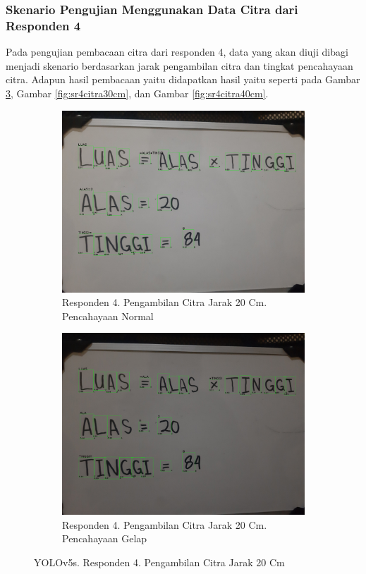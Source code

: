 \subsubsection{Skenario Pengujian Menggunakan Data Citra dari Responden 4}
\label{subsubsec:sskenarioresponden4}

Pada pengujian pembacaan citra dari responden 4, data yang akan diuji dibagi menjadi skenario berdasarkan jarak pengambilan citra dan tingkat pencahayaan citra. Adapun hasil pembacaan yaitu didapatkan hasil yaitu seperti pada Gambar \ref*{fig:sr4citra20cm}, Gambar \ref*{fig:sr4citra30cm}, dan Gambar \ref*{fig:sr4citra40cm}.

\begin{figure}[H]
  \begin{subfigure}{.5\textwidth}
    \centering
    \captionsetup{width=.8\linewidth}
    \includegraphics[width=.8\linewidth]{gambar/yolov5s/responden4/hakimaxt20cm00-result.jpg}
    \caption{Responden 4. Pengambilan Citra Jarak 20 Cm. Pencahayaan Normal}
    \label{fig:sr4tcitra20cm}
  \end{subfigure}%
  \begin{subfigure}{.5\textwidth}
    \centering
    \captionsetup{width=.8\linewidth}
    \includegraphics[width=.8\linewidth]{gambar/yolov5s/responden4/hakimaxt20cm10-result.jpg}
    \caption{Responden 4. Pengambilan Citra Jarak 20 Cm. Pencahayaan Gelap}
    \label{fig:sr4gcitra20cm}
  \end{subfigure}
  \caption{YOLOv5s. Responden 4. Pengambilan Citra Jarak 20 Cm}
  \label{fig:sr4citra20cm}
\end{figure}

